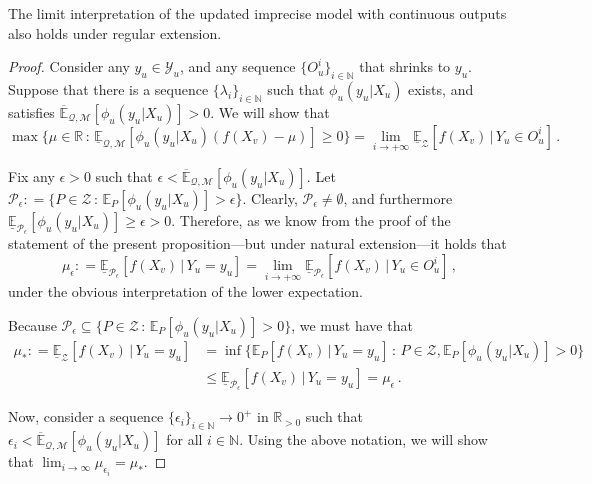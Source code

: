 \documentclass[twoside,11pt]{article}
\newcommand{\nats}{\mathbb{N}}
\newcommand{\reals}{\mathbb{R}}
\newcommand{\realspos}{\reals_{>0}}
\newcommand{\observs}{\mathcal{Y}}
\newcommand{\lexp}{\underline{\mathbb{E}}_{\rateset,\mathcal{M}}}
\newcommand{\uexp}{\overline{\mathbb{E}}_{\rateset,\mathcal{M}}}
\newcommand{\rateset}{\mathcal{Q}}
\newcommand{\coloneqq}{:\!=}
\begin{document}
\begin{proposition}
The limit interpretation of the updated imprecise model with continuous outputs also holds under regular extension.
\end{proposition}
\begin{proof}
Consider any $y_u\in\observs_u$, and any sequence $\{O_u^i\}_{i\in\nats}$ that shrinks to $y_u$. Suppose that there is a sequence $\{\lambda_i\}_{i\in\nats}$ such that $\phi_u(y_u\vert X_u)$ exists, and satisfies $\uexp[\phi_u(y_u\vert X_u)]>0$. We will show that
\begin{equation*}
\max\{\mu\in\reals\,:\,\lexp[\phi_u(y_u\vert X_u)(f(X_v)-\mu)]\geq 0\} = \lim_{i\to+\infty} \underline{\mathbb{E}}_\mathcal{Z}[f(X_v)\,\vert\,Y_u\in O_u^i]\,.
\end{equation*}

Fix any $\epsilon >0$ such that $\epsilon<\uexp[\phi_u(y_u\vert X_u)]$. Let $\mathcal{P}_\epsilon \coloneqq \{P\in\mathcal{Z}\,:\,\mathbb{E}_P[\phi_u(y_u\vert X_u)]>\epsilon\}$. Clearly, $\mathcal{P}_\epsilon\neq\emptyset$, and furthermore $\underline{\mathbb{E}}_{\mathcal{P}_\epsilon}[\phi_u(y_u\vert X_u)] \geq \epsilon > 0$. Therefore, as we know from the proof of the statement of the present proposition---but under natural extension---it holds that
\begin{equation}\label{eq:reg_ext_limit:subsets_converge_to_updated}
\mu_\epsilon \coloneqq \underline{\mathbb{E}}_{\mathcal{P}_\epsilon}[f(X_v)\,\vert\,Y_u=y_u] = \lim_{i\to+\infty} \underline{\mathbb{E}}_{\mathcal{P}_\epsilon}[f(X_v)\,\vert\,Y_u\in O_u^i]\,,
\end{equation}
under the obvious interpretation of the lower expectation.

Because $\mathcal{P}_\epsilon\subseteq\{P\in\mathcal{Z}\,:\,\mathbb{E}_P[\phi_u(y_u\vert X_u)]>0\}$, we must have that
\begin{align*}
\mu_* \coloneqq \underline{\mathbb{E}}_{\mathcal{Z}}[f(X_v)\,\vert\,Y_u=y_u] &= \inf\{\mathbb{E}_P[f(X_v)\,\vert\,Y_u=y_u]\,:\,P\in\mathcal{Z},\mathbb{E}_P[\phi_u(y_u\vert X_u)]>0\} \\
 &\leq \underline{\mathbb{E}}_{\mathcal{P}_\epsilon}[f(X_v)\,\vert\,Y_u=y_u] = \mu_\epsilon\,.
\end{align*}

Now, consider a sequence $\{\epsilon_i\}_{i\in\nats}\to 0^+$ in $\realspos$ such that $\epsilon_i<\uexp[\phi_u(y_u\vert X_u)]$ for all $i\in\nats$. Using the above notation, we will show that $\lim_{i\to\infty}\mu_{\epsilon_i}=\mu_*$. 


\end{proof}
\end{document}
